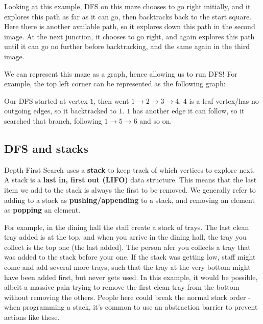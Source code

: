 \documentclass{article}
\begin{document}
Looking at this example, DFS on this maze chooses to go right initially, and it explores this path as far as it can go, then backtracks back to the start square. Here there is another available path, so it explores down this path in the second image. At the next junction, it chooses to go right, and again explores this path until it can go no further before backtracking, and the same again in the third image. 

\begin{note}
    We can represent this maze as a graph, hence allowing us to run DFS! For example, the top left corner can be represented as the following graph:
    
    \centering

    Our DFS started at vertex $1$, then went $1 \to 2 \to 3 \to 4$. $4$ is a leaf vertex/has no outgoing edges, so it backtracked to $1$. $1$ has another edge it can follow, so it searched that branch, following $1 \to 5 \to 6$ and so on.
\end{note}

\subsection{DFS and stacks}

Depth-First Search uses a \textbf{stack} to keep track of which vertices to explore next. A stack is a \textbf{last in, first out (LIFO)} data structure. This means that the last item we add to the stack is always the first to be removed. We generally refer to adding to a stack as \textbf{pushing/appending} to a stack, and removing an element as \textbf{popping} an element.

For example, in the dining hall the staff create a stack of trays. The last clean tray added is at the top, and when you arrive in the dining hall, the tray you collect is the top one (the last added). The person afer you collects a tray that was added to the stack before your one. If the stack was getting low, staff might come and add several more trays, such that the tray at the very bottom might have been added first, but never gets used. In this example, it would be possible, albeit a massive pain trying to remove the first clean tray from the bottom without removing the others. People here could break the normal stack order - when programming a stack, it's common to use an abstraction barrier to prevent actions like these. 
\end{document}

